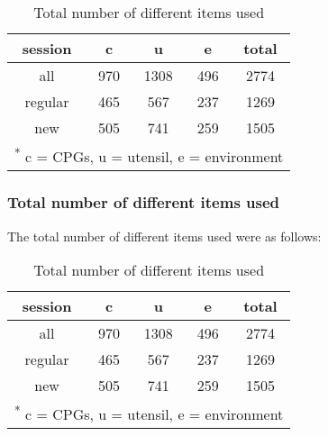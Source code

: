 \documentclass[]{article}
\begin{document}
\begin{table}

\caption{\label{tab:unnamed-chunk-11}Total number of different items used}
\centering
\begin{tabular}[t]{c|c|c|c|c}
\hline
session & c & u & e & total\\
\hline
all & 970 & 1308 & 496 & 2774\\
\hline
regular & 465 & 567 & 237 & 1269\\
\hline
new & 505 & 741 & 259 & 1505\\
\hline
\multicolumn{5}{l}{\textsuperscript{*} c = CPGs, u = utensil, e = environment}\\
\end{tabular}
\end{table}

\subsubsection{Total number of different items
used}\label{total-number-of-different-items-used}

The total number of different items used were as follows:

\begin{table}

\caption{\label{tab:unnamed-chunk-12}Total number of different items used}
\centering
\begin{tabular}[t]{c|c|c|c|c}
\hline
session & c & u & e & total\\
\hline
all & 970 & 1308 & 496 & 2774\\
\hline
regular & 465 & 567 & 237 & 1269\\
\hline
new & 505 & 741 & 259 & 1505\\
\hline
\multicolumn{5}{l}{\textsuperscript{*} c = CPGs, u = utensil, e = environment}\\
\end{tabular}
\end{table}
\end{document}
